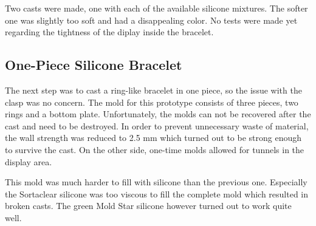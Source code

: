 Two casts were made, one with each of the available silicone mixtures. The softer one was slightly too soft and had a disappealing color. No tests were made yet regarding the tightness of the diplay inside the bracelet.

\subsection{One-Piece Silicone Bracelet}
The next step was to cast a ring-like bracelet in one piece, so the issue with the clasp was no concern. The mold for this prototype consists of three pieces, two rings and a bottom plate. Unfortunately, the molds can not be recovered after the cast and need to be destroyed. In order to prevent unnecessary waste of material, the wall strength was reduced to 2.5 mm which turned out to be strong enough to survive the cast. On the other side, one-time molds allowed for tunnels in the display area.

This mold was much harder to fill with silicone than the previous one. Especially the Sortaclear silicone was too viscous to fill the complete mold which resulted in broken casts. The green Mold Star silicone however turned out to work quite well.